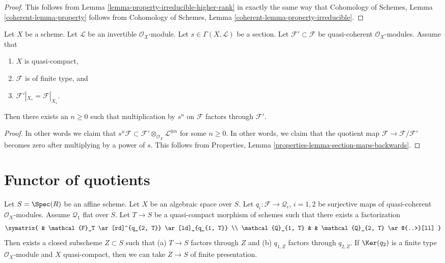 \begin{proof}
This follows from Lemma \ref{lemma-property-irreducible-higher-rank}
in exactly the same way that
Cohomology of Schemes, Lemma \ref{coherent-lemma-property} follows from
Cohomology of Schemes, Lemma \ref{coherent-lemma-property-irreducible}.
\end{proof}

\begin{lemma}
\label{lemma-section-maps-back-into}
Let $X$ be a scheme.
Let $\mathcal{L}$ be an invertible $\mathcal{O}_X$-module.
Let $s \in \Gamma(X, \mathcal{L})$ be a section.
Let $\mathcal{F}' \subset \mathcal{F}$ be quasi-coherent
$\mathcal{O}_X$-modules. Assume that
\begin{enumerate}
\item $X$ is quasi-compact,
\item $\mathcal{F}$ is of finite type, and
\item $\mathcal{F}'|_{X_s} = \mathcal{F}|_{X_s}$.
\end{enumerate}
Then there exists an $n \geq 0$ such that
multiplication by $s^n$ on $\mathcal{F}$ factors
through $\mathcal{F}'$.
\end{lemma}

\begin{proof}
In other words we claim that
$s^n\mathcal{F} \subset
\mathcal{F}' \otimes_{\mathcal{O}_X} \mathcal{L}^{\otimes n}$
for some $n \geq 0$. In other words, we claim that the quotient map
$\mathcal{F} \to \mathcal{F}/\mathcal{F}'$ becomes
zero after multiplying by a power of $s$.
This follows from Properties, Lemma
\ref{properties-lemma-section-maps-backwards}.
\end{proof}






\section{Functor of quotients}
\label{section-quotients}

\begin{lemma}
\label{lemma-factors-through-quotient}
Let $S = \Spec(R)$ be an affine scheme. Let $X$ be an algebraic space over
$S$. Let $q_i : \mathcal{F} \to \mathcal{Q}_i$, $i = 1, 2$
be surjective maps of quasi-coherent $\mathcal{O}_X$-modules.
Assume $\mathcal{Q}_1$ flat over $S$. Let $T \to S$ be a quasi-compact
morphism of schemes such that there exists a factorization
$$
\xymatrix{
& \mathcal{F}_T \ar[rd]^{q_{2, T}} \ar[ld]_{q_{1, T}} \\
\mathcal{Q}_{1, T} & & \mathcal{Q}_{2, T} \ar@{..>}[ll]
}
$$
Then exists a closed subscheme $Z \subset S$ such that
(a) $T \to S$ factors through $Z$ and (b)
$q_{1, Z}$ factors through $q_{2, Z}$.
If $\Ker(q_2)$ is a finite type $\mathcal{O}_X$-module and $X$
quasi-compact, then we can take $Z \to S$ of finite presentation.
\end{lemma}

